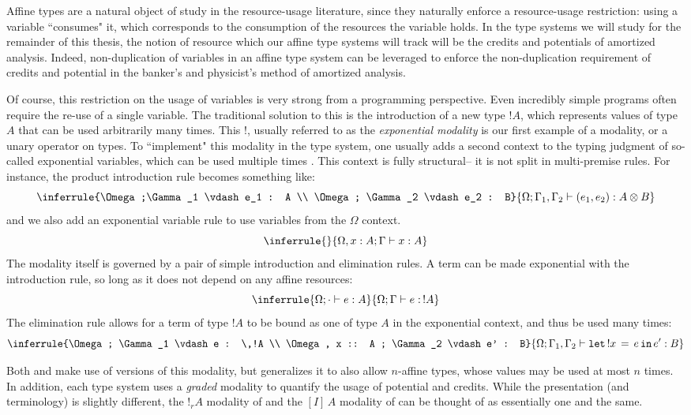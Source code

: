 Affine types are a natural object of study in the resource-usage literature, since they naturally enforce a resource-usage restriction: using a variable ``consumes" it, which corresponds to the consumption of the resources the variable holds. In the type systems we will study for the remainder of this thesis, the notion of resource which our affine type systems will track will be the credits and potentials of amortized analysis. Indeed, non-duplication of variables in an affine type system can be leveraged to enforce the non-duplication requirement of credits and potential in the banker's and physicist's method of amortized analysis.

Of course, this restriction on the usage of variables is very strong from a programming perspective. Even incredibly simple programs often require the re-use of a single variable. The traditional solution to this is the introduction of a new type $!A$, which represents values of type $A$ that can be used arbitrarily many times. This $!$, usually referred to as the \textit{exponential modality} is our first example of a modality, or a unary operator on types. To ``implement" this modality in the type system, one usually adds a second context to the typing judgment of so-called exponential variables, which can be used multiple times \citehere. This context is fully structural-- it is not split in multi-premise rules. For instance, the product introduction rule becomes something like:
$$
\inferrule{\Omega;\Gamma_1 \vdash e_1 : A \\ \Omega; \Gamma_2 \vdash e_2 : B}{\Omega; \Gamma_1,\Gamma_2 \vdash (e_1,e_2) : A \otimes B}
$$
and we also add an exponential variable rule to use variables from the $\Omega$ context.
$$
\inferrule{ }{\Omega, x : A; \Gamma \vdash x : A}
$$
The modality itself is governed by a pair of simple introduction and elimination rules. A term can be made exponential with the introduction rule, so long as it does not depend on any affine resources:
$$
\inferrule{\Omega ; \cdot \vdash e : A}{\Omega ; \Gamma \vdash e : \, !A}
$$
The elimination rule allows for a term of type $!A$ to be bound as one of type $A$ in the exponential context, and thus be used many times:
$$
\inferrule{\Omega ; \Gamma_1 \vdash e : \,!A \\ \Omega, x :: A ; \Gamma_2 \vdash e' : B}{\Omega ; \Gamma_1,\Gamma_2 \vdash \texttt{let} \, !x \, = \, e \,\texttt{in}\, e' : B}
$$

Both \lambdaA and \lambdaamor make use of versions of this modality, but \lambdaA generalizes it to also allow $n$-affine types, whose values may be used at most $n$ times. In addition, each type system uses a \textit{graded} modality to quantify the usage of potential and credits. While the presentation (and terminology) is slightly different, the $!_r A$ modality of \lambdaA and the $[I] \, A$ modality of \lambdaamor can be thought of as essentially one and the same. 